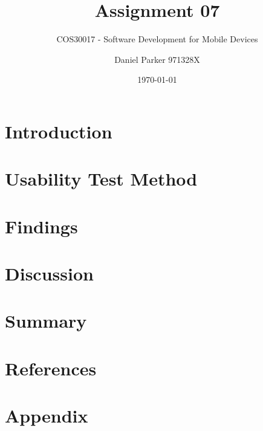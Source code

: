 \documentclass[11pt,english,numbers=endperiod,parskip=half]{scrartcl}
\title{Assignment 07}
\subtitle{COS30017 - Software Development for Mobile Devices}
\author{Daniel Parker 971328X}
\date{\today}
\begin{document}
\maketitle
\thispagestyle{empty}
\section{Introduction}
\section{Usability Test Method}
\section{Findings}
\section{Discussion}
\section{Summary}
\section{References}
\section{Appendix}
		
		
\end{document}

